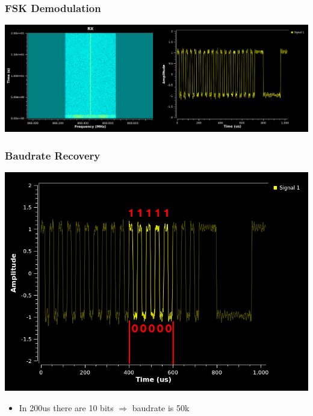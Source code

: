 \documentclass[aspectratio=169]{beamer}
\begin{document}
\begin{frame}
	\frametitle{FSK Demodulation}

	\begin{center}
		\includegraphics[width=1.0\textwidth]{gnuradio-post-demodulation.png}
	\end{center}
\end{frame}

\begin{frame}
	\frametitle{Baudrate Recovery}

	\begin{center}
		\includegraphics[height=0.8\textheight]{gnuradio-post-demodulation-timings.png}
	\end{center}

	\begin{itemize}
		\item In 200us there are 10 bits $\Rightarrow$ baudrate is 50k
	\end{itemize}
\end{frame}
\end{document}
